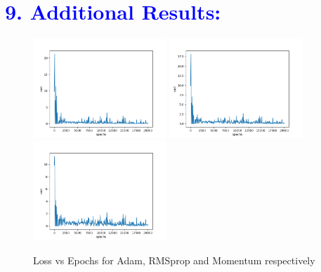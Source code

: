 \documentclass[a4paper,10pt,twoside]{article}
\begin{document}
\section*{\textcolor{blue}{9. Additional Results:}}
\begin{figure}[h!]
\centering
\includegraphics[scale=1.0, width=5cm]{Fig31_Adam.png}
\includegraphics[scale=1.0, width=5cm]{Fig32_RMSprop.png}
\includegraphics[scale=1.0, width=5cm]{Fig33_SGD_momentum.png}
\caption*{Loss vs Epochs for Adam, RMSprop and Momentum respectively}
\end{figure}
\end{document}
